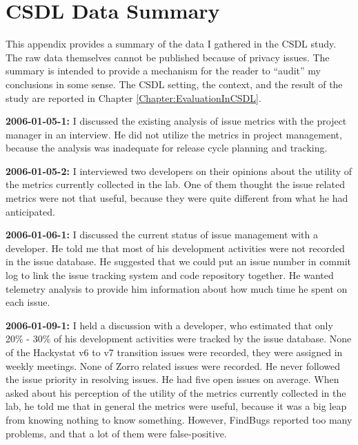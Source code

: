 \chapter{CSDL Data Summary}
\label{Appendix:DataInCSDL}

This appendix provides a summary of the data I gathered in the CSDL study. The raw data themselves cannot be published because of privacy issues. The summary is intended to provide a mechanism for the reader to ``audit'' my conclusions in some sense. The CSDL setting, the context, and the result of the study are reported in Chapter \ref{Chapter:EvaluationInCSDL}.


\setlength{\parindent}{0mm} %
\setlength{\parskip}{3mm}   %
  
\textbf{2006-01-05-1:}
I discussed the existing analysis of issue metrics with the project manager in an interview. He did not utilize the metrics in project management, because the analysis was inadequate for release cycle planning and tracking. 

\textbf{2006-01-05-2:}
I interviewed two developers on their opinions about the utility of the metrics currently collected in the lab. One of them thought the issue related metrics were not that useful, because they were quite different from what he had anticipated.

\textbf{2006-01-06-1:}
I discussed the current status of issue management with a developer. He told me that most of his development activities were not recorded in the issue database. He suggested that we could put an issue number in commit log to link the issue tracking system and code repository together. He wanted telemetry analysis to provide him information about how much time he spent on each issue.

\textbf{2006-01-09-1:}
I held a discussion with a developer, who estimated that only 20\% - 30\% of his development activities were tracked by the issue database. None of the Hackystat v6 to v7 transition issues were recorded, they were assigned in weekly meetings. None of Zorro related issues were recorded. He never followed the issue priority in resolving issues. He had five open issues on average. 
When asked about his perception of the utility of the metrics currently collected in the lab, he told me that in general the metrics were useful, because it was a big leap from knowing nothing to know something. However, FindBugs reported too many problems, and that a lot of them were false-positive.

